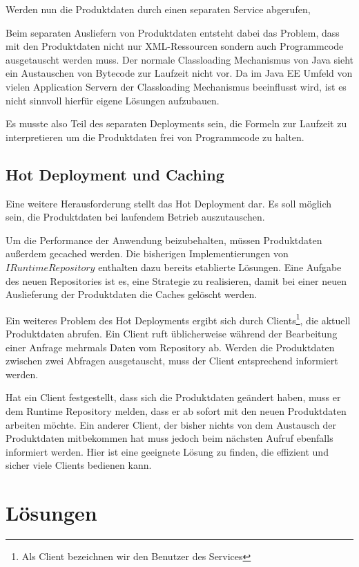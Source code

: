 \documentclass[headsepline=true, footsepline=true]{scrartcl}
\begin{document}
Werden nun die Produktdaten durch einen separaten Service abgerufen, 

Beim separaten Ausliefern von Produktdaten entsteht dabei das Problem, dass mit
den Produktdaten nicht nur XML-Ressourcen sondern auch Programmcode ausgetauscht
werden muss. Der normale Classloading Mechanismus von Java sieht ein Austauschen
von Bytecode zur Laufzeit nicht vor. Da im Java EE Umfeld von vielen Application
Servern der Classloading Mechanismus beeinflusst wird, ist es nicht sinnvoll
hierfür eigene Lösungen aufzubauen.

Es musste also Teil des separaten Deployments sein, die Formeln
zur Laufzeit zu interpretieren um die Produktdaten frei von Programmcode zu
halten.

\subsection{Hot Deployment und Caching}
\label{hot_deployment}

Eine weitere Herausforderung stellt das Hot Deployment dar. Es soll möglich
sein, die Produktdaten bei laufendem Betrieb auszutauschen.

Um die Performance der Anwendung beizubehalten, müssen Produktdaten außerdem
gecached werden. Die bisherigen Implementierungen von $IRuntimeRepository$
enthalten dazu bereits etablierte Lösungen. Eine Aufgabe des neuen Repositories
ist es, eine Strategie zu realisieren, damit bei einer neuen Auslieferung der
Produktdaten die Caches gelöscht werden.

Ein weiteres Problem des Hot Deployments ergibt sich durch
Clients\footnote{Als Client bezeichnen wir den Benutzer des Services}, die aktuell Produktdaten abrufen. Ein Client ruft
üblicherweise während der Bearbeitung einer Anfrage mehrmals Daten vom
Repository ab. Werden die Produktdaten zwischen zwei Abfragen ausgetauscht, 
muss der Client entsprechend informiert werden.

Hat ein Client festgestellt, dass sich die Produktdaten geändert haben, muss er
dem Runtime Repository melden, dass er ab sofort mit den neuen Produktdaten
arbeiten möchte. Ein anderer Client, der bisher nichts von dem Austausch der
Produktdaten mitbekommen hat muss jedoch beim nächsten Aufruf ebenfalls
informiert werden. Hier ist eine geeignete Lösung zu finden, die effizient
und sicher viele Clients bedienen kann.

\section{Lösungen}
\end{document}
